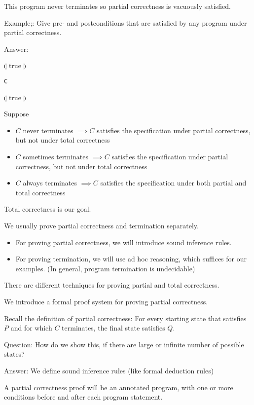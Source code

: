 \documentclass{article}
\begin{document}
This program never terminates so partial correctness is vacuously satisfied.

Example;: Give pre- and postconditions that are satisfied by any program under partial correctness.

Answer:

$\llparenthesis$ true $\rrparenthesis$
\begin{verbatim}
C
\end{verbatim}
$\llparenthesis$ true $\rrparenthesis$

Suppose
\begin{itemize}
    \item $C$ never terminates $\implies C$ satisfies the specification under partial correctness, but not under total correctness
    \item $C$ sometimes terminates $\implies C$ satisfies the specification under partial correctness, but not under total correctness
    \item $C$ always terminates $\implies C$ satisfies the specification under both partial and total correctness
\end{itemize}

Total correctness is our goal.

We usually prove partial correctness and termination separately.
\begin{itemize}
    \item For proving partial correctness, we will introduce sound inference rules.
    \item For proving termination, we will use ad hoc reasoning, which suffices for our examples. (In general, program termination is undecidable)
\end{itemize}

There are different techniques for proving partial and total correctness.

We introduce a formal proof system for proving partial correctness.

Recall the definition of partial correctness: For every starting state that satisfies $P$ and for which $C$ terminates, the final state satisfies $Q$.

Question: How do we show this, if there are large or infinite number of possible states?

Answer: We define sound inference rules (like formal deduction rules)

A partial correctness proof will be an annotated program, with one or more conditions before and after each program statement.
\end{document}

